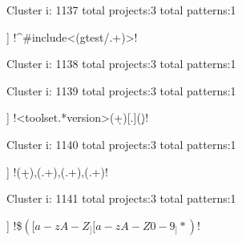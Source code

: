 Cluster i: 1137
total projects:3
total patterns:1
\begin{multicols}{1}
\begin{description}[noitemsep,topsep=0pt]
\item [[3] ] \cverb!^\s*#\s*include\s*<(gtest/.+)>!
\end{description}
\end{multicols}







Cluster i: 1138
total projects:3
total patterns:1
\begin{multicols}{1}
\end{multicols}







Cluster i: 1139
total projects:3
total patterns:1
\begin{multicols}{1}
\begin{description}[noitemsep,topsep=0pt]
\item [[3] ] \cverb!<toolset.*version>(\d+)[.](\d*)!
\end{description}
\end{multicols}







Cluster i: 1140
total projects:3
total patterns:1
\begin{multicols}{1}
\begin{description}[noitemsep,topsep=0pt]
\item [[3] ] \cverb!(\d+),\s*(.+),\s*(.+),\s*(.+)!
\end{description}
\end{multicols}







Cluster i: 1141
total projects:3
total patterns:1
\begin{multicols}{1}
\begin{description}[noitemsep,topsep=0pt]
\item [[3] ] \cverb!\$\(([a-zA-Z_][a-zA-Z0-9_]*)\)!
\end{description}
\end{multicols}







